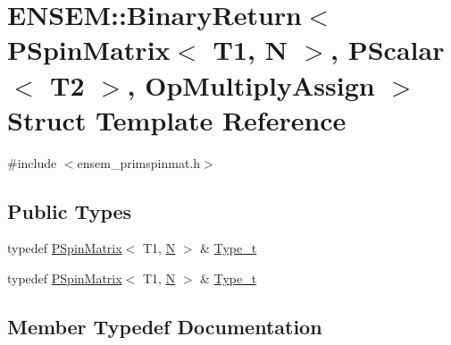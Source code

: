 \hypertarget{structENSEM_1_1BinaryReturn_3_01PSpinMatrix_3_01T1_00_01N_01_4_00_01PScalar_3_01T2_01_4_00_01OpMultiplyAssign_01_4}{}\section{E\+N\+S\+EM\+:\+:Binary\+Return$<$ P\+Spin\+Matrix$<$ T1, N $>$, P\+Scalar$<$ T2 $>$, Op\+Multiply\+Assign $>$ Struct Template Reference}
\label{structENSEM_1_1BinaryReturn_3_01PSpinMatrix_3_01T1_00_01N_01_4_00_01PScalar_3_01T2_01_4_00_01OpMultiplyAssign_01_4}


{\ttfamily \#include $<$ensem\+\_\+primspinmat.\+h$>$}

\subsection*{Public Types}
\begin{DoxyCompactItemize}
\item 
typedef \mbox{\hyperlink{classENSEM_1_1PSpinMatrix}{P\+Spin\+Matrix}}$<$ T1, \mbox{\hyperlink{operator__name__util_8cc_a7722c8ecbb62d99aee7ce68b1752f337}{N}} $>$ \& \mbox{\hyperlink{structENSEM_1_1BinaryReturn_3_01PSpinMatrix_3_01T1_00_01N_01_4_00_01PScalar_3_01T2_01_4_00_01OpMultiplyAssign_01_4_a34838a8c9d99bad9b0896dde01299b03}{Type\+\_\+t}}
\item 
typedef \mbox{\hyperlink{classENSEM_1_1PSpinMatrix}{P\+Spin\+Matrix}}$<$ T1, \mbox{\hyperlink{operator__name__util_8cc_a7722c8ecbb62d99aee7ce68b1752f337}{N}} $>$ \& \mbox{\hyperlink{structENSEM_1_1BinaryReturn_3_01PSpinMatrix_3_01T1_00_01N_01_4_00_01PScalar_3_01T2_01_4_00_01OpMultiplyAssign_01_4_a34838a8c9d99bad9b0896dde01299b03}{Type\+\_\+t}}
\end{DoxyCompactItemize}


\subsection{Member Typedef Documentation}
\mbox{\label{structENSEM_1_1BinaryReturn_3_01PSpinMatrix_3_01T1_00_01N_01_4_00_01PScalar_3_01T2_01_4_00_01OpMultiplyAssign_01_4_a34838a8c9d99bad9b0896dde01299b03}} 
